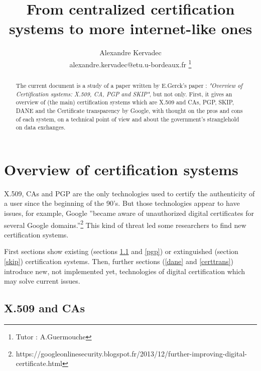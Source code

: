 \documentclass[journal, a4paper]{IEEEtran}
\begin{document}
	\title{From centralized certification systems to more internet-like ones}
	\author{Alexandre Kervadec\\
	alexandre.kervadec@etu.u-bordeaux.fr
	\thanks{Tutor : A.Guermouche}}
	\maketitle

\begin{abstract}
The current document is a study of a paper written by E.Gerck's paper : \textit{"Overview of Certification systems: X.509, CA, PGP and SKIP"}\cite{gerck1998overview}, but not only. First, it gives an overview of (the main) certification systems which are X.509 and CAs, PGP, SKIP, DANE and the Certificate transparency by Google, with thought on the pros and cons of each system, on a technical point of view and about the government's stranglehold on data exchanges.
\end{abstract}

\section{Overview of certification systems}

X.509, CAs and PGP are the only technologies used to certify the authenticity of a user since the beginning of the 90's. But those technologies appear to have issues, for example, Google ''became aware of unauthorized digital certificates for several Google domains.''\footnote{https://googleonlinesecurity.blogspot.fr/2013/12/further-improving-digital-certificate.html} This kind of threat led some researchers to find new certification systems.

First sections show existing (sections \ref{x509} and \ref{pgp}) or extinguished (section \ref{skip}) certification systems. Then, further sections (\ref{dane} and \ref{certtrans}) introduce new, not implemented yet, technologies of digital certification which may solve current issues. 


\subsection{X.509 and CAs}
\label{x509}
\end{document}
